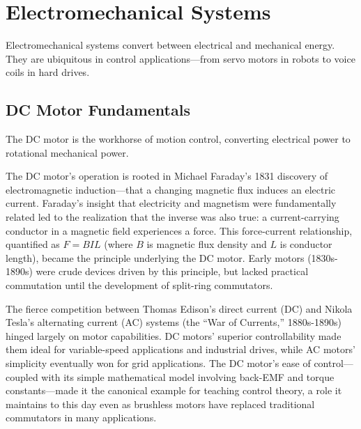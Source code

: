 
\section{Electromechanical Systems}
\label{sec:electromechanical}

Electromechanical systems convert between electrical and mechanical energy. They are ubiquitous in control applications---from servo motors in robots to voice coils in hard drives.

\subsection{DC Motor Fundamentals}
\label{subsec:dc_motor}

The DC motor is the workhorse of motion control, converting electrical power to rotational mechanical power.
\begin{historicalbox}[title=Historical Context: Faraday's Electromagnetic Induction and the Motor-Generator Principle]
The DC motor's operation is rooted in Michael Faraday's 1831 discovery of electromagnetic induction---that a changing magnetic flux induces an electric current. Faraday's insight that electricity and magnetism were fundamentally related led to the realization that the inverse was also true: a current-carrying conductor in a magnetic field experiences a force. This force-current relationship, quantified as $F = BIL$ (where $B$ is magnetic flux density and $L$ is conductor length), became the principle underlying the DC motor. Early motors (1830s-1890s) were crude devices driven by this principle, but lacked practical commutation until the development of split-ring commutators.

The fierce competition between Thomas Edison's direct current (DC) and Nikola Tesla's alternating current (AC) systems (the ``War of Currents,'' 1880s-1890s) hinged largely on motor capabilities. DC motors' superior controllability made them ideal for variable-speed applications and industrial drives, while AC motors' simplicity eventually won for grid applications. The DC motor's ease of control---coupled with its simple mathematical model involving back-EMF and torque constants---made it the canonical example for teaching control theory, a role it maintains to this day even as brushless motors have replaced traditional commutators in many applications.
\end{historicalbox}

